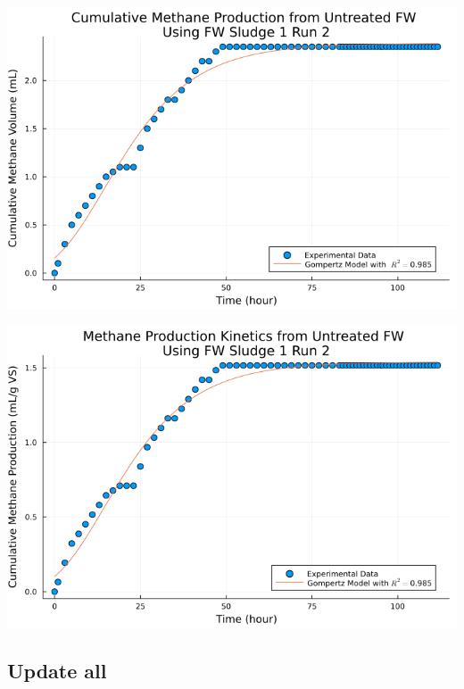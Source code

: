 \documentclass[11pt]{article}
\begin{document}
\begin{center}
\includegraphics[width=.9\linewidth]{../plots/BMPs/Untreated FW/methane_kinetics_untreated_fw_s1_r2_hour.png}
\end{center}

\begin{center}
\includegraphics[width=.9\linewidth]{../plots/BMPs/Untreated FW/specific_methane_kinetics_untreated_fw_s1_r2_hour.png}
\end{center}

\subsection{Update all}
\label{sec:org155d420}
\end{document}
